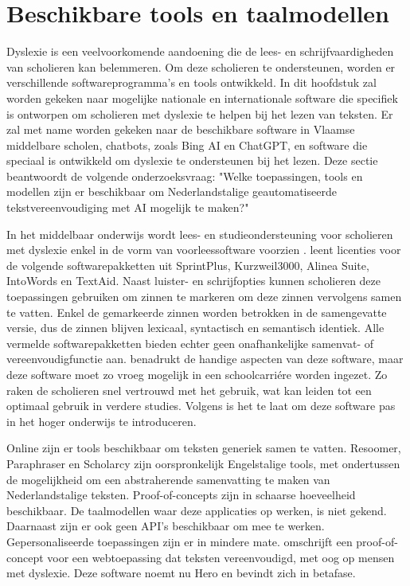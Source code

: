 \section{Beschikbare tools en taalmodellen}

Dyslexie is een veelvoorkomende aandoening die de lees- en schrijfvaardigheden van scholieren kan belemmeren. Om deze scholieren te ondersteunen, worden er verschillende softwareprogramma's en tools ontwikkeld. In dit hoofdstuk zal worden gekeken naar mogelijke nationale en internationale software die specifiek is ontworpen om scholieren met dyslexie te helpen bij het lezen van teksten. Er zal met name worden gekeken naar de beschikbare software in Vlaamse middelbare scholen, chatbots, zoals Bing AI en ChatGPT, en software die speciaal is ontwikkeld om dyslexie te ondersteunen bij het lezen. Deze sectie beantwoordt de volgende onderzoeksvraag: "Welke toepassingen, tools en modellen zijn er beschikbaar om Nederlandstalige geautomatiseerde tekstvereenvoudiging met AI mogelijk te maken?"

\medspace

In het middelbaar onderwijs wordt lees- en studieondersteuning voor scholieren met dyslexie enkel in de vorm van voorleessoftware voorzien \autocite{DeCraemer2018, OnderwijsVlaanderen2023}. \textcite{OnderwijsVlaanderen2023} leent licenties voor de volgende softwarepakketten uit SprintPlus, Kurzweil3000, Alinea Suite, IntoWords en TextAid. Naast luister- en schrijfopties kunnen scholieren deze toepassingen gebruiken om zinnen te markeren om deze zinnen vervolgens samen te vatten. Enkel de gemarkeerde zinnen worden betrokken in de samengevatte versie, dus de zinnen blijven lexicaal, syntactisch en semantisch identiek. Alle vermelde softwarepakketten bieden echter geen onafhankelijke samenvat- of vereenvoudigfunctie aan. \textcite{Tops2018} benadrukt de handige aspecten van deze software, maar deze software moet zo vroeg mogelijk in een schoolcarriére worden ingezet. Zo raken de scholieren snel vertrouwd met het gebruik, wat kan leiden tot een optimaal gebruik in verdere studies. Volgens \textcite{Tops2018} is het te laat om deze software pas in het hoger onderwijs te introduceren.

\medspace

Online zijn er tools beschikbaar om teksten generiek samen te vatten. Resoomer, Paraphraser en Scholarcy zijn oorspronkelijk Engelstalige tools, met ondertussen de mogelijkheid om een abstraherende samenvatting te maken van Nederlandstalige teksten. Proof-of-concepts zijn in schaarse hoeveelheid beschikbaar. De taalmodellen waar deze applicaties op werken, is niet gekend. Daarnaast zijn er ook geen API's beschikbaar om mee te werken. Gepersonaliseerde toepassingen zijn er in mindere mate. \textcite{Bingel2018} omschrijft een proof-of-concept voor een webtoepassing dat teksten vereenvoudigd, met oog op mensen met dyslexie. Deze software noemt nu Hero en bevindt zich in betafase.

